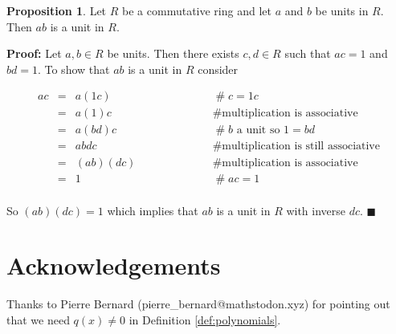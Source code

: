 \documentclass[11pt, oneside]{article}   	%
\theoremstyle{definition}
\newtheorem{proposition}{Proposition}[section]
\begin{document}
\bigskip


\begin{proposition}
Let $R$ be a commutative ring and let $a$ and $b$ be units in
$R$. Then $ab$ is a unit in $R$. 
\end{proposition}

\noindent
\textbf{Proof:} Let $a, b \in R$ be units. Then there exists $c,
d \in R$ such that $ac = 1$ and $bd = 1$. To show that $ab$ is a
unit in $R$ consider


\begin{equation*}
\begin{array}{rlll} 
ac
&=&  a(1c)              &\qquad\qquad\qquad \mathrel{\#} c = 1 c \\
&=&  a(1)c              &\qquad\qquad\qquad \mathrel{\#} \text{multiplication is associative} \\
&=&  a(bd)c             &\qquad\qquad\qquad \mathrel{\#} \text{$b$ a unit so $1 = bd$} \\
&=&  abdc               &\qquad\qquad\qquad \mathrel{\#} \text{multiplication is still associative} \\
&=&  (ab)(dc)           &\qquad\qquad\qquad \mathrel{\#} \text{multiplication is associative} \\
&=&  1                  &\qquad\qquad\qquad \mathrel{\#} ac = 1 \\
\end{array}
\end{equation*}

\bigskip
\noindent
So $(ab)(dc) = 1$ which implies that $ab$ is a unit in $R$ with
inverse $dc$. $\blacksquare$ 


\section{Acknowledgements}
Thanks to Pierre Bernard (pierre\_bernard@mathstodon.xyz) for pointing out that
we need $q(x) \neq 0$ in Definition \ref{def:polynomials}.




\end{document}
